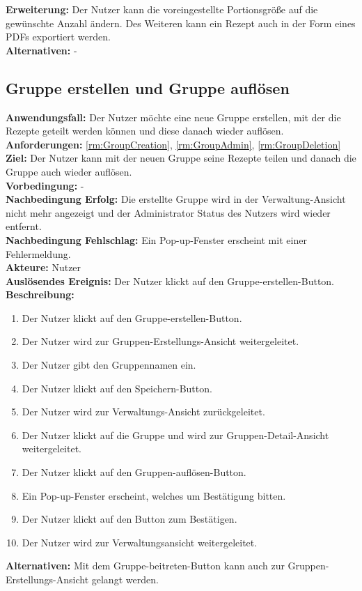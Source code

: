 \documentclass[parskip=full]{scrartcl}
\begin{document}
\textbf{Erweiterung:} Der Nutzer kann die voreingestellte Portionsgröße auf die gewünschte Anzahl ändern. Des Weiteren kann ein Rezept auch in der Form eines PDFs exportiert werden.\\
\textbf{Alternativen:} -
\newpage

\subsection{Gruppe erstellen und Gruppe auflösen}
\textbf{Anwendungsfall:} Der Nutzer möchte eine neue Gruppe erstellen, mit der die Rezepte geteilt werden können und diese danach wieder auflösen.\\
\textbf{Anforderungen:} \ref{rm:GroupCreation}, \ref{rm:GroupAdmin}, \ref{rm:GroupDeletion} \\
\textbf{Ziel:} Der Nutzer kann mit der neuen Gruppe seine Rezepte teilen und danach die Gruppe auch wieder auflösen.\\
\textbf{Vorbedingung:} -\\
\textbf{Nachbedingung Erfolg:} Die erstellte Gruppe wird in der Verwaltung-Ansicht nicht mehr angezeigt und der Administrator Status des Nutzers wird wieder entfernt.\\
\textbf{Nachbedingung Fehlschlag:} Ein Pop-up-Fenster erscheint mit einer Fehlermeldung.\\
\textbf{Akteure:} Nutzer\\
\textbf{Auslösendes Ereignis:} Der Nutzer klickt auf den Gruppe-erstellen-Button.\\
\textbf{Beschreibung:}
\begin{enumerate}
    \item Der Nutzer klickt auf den Gruppe-erstellen-Button.
    \item Der Nutzer wird zur Gruppen-Erstellungs-Ansicht weitergeleitet.
    \item Der Nutzer gibt den Gruppennamen ein.
    \item Der Nutzer klickt auf den Speichern-Button.
    \item Der Nutzer wird zur Verwaltungs-Ansicht zurückgeleitet.
    \item Der Nutzer klickt auf die Gruppe und wird zur Gruppen-Detail-Ansicht weitergeleitet.
    \item Der Nutzer klickt auf den Gruppen-auflösen-Button.
    \item Ein Pop-up-Fenster erscheint, welches um Bestätigung bitten.
    \item Der Nutzer klickt auf den Button zum Bestätigen.
    \item Der Nutzer wird zur Verwaltungsansicht weitergeleitet.
\end{enumerate}
\textbf{Alternativen:} Mit dem Gruppe-beitreten-Button kann auch zur Gruppen-Erstellungs-Ansicht gelangt werden.
\newpage
\end{document}
